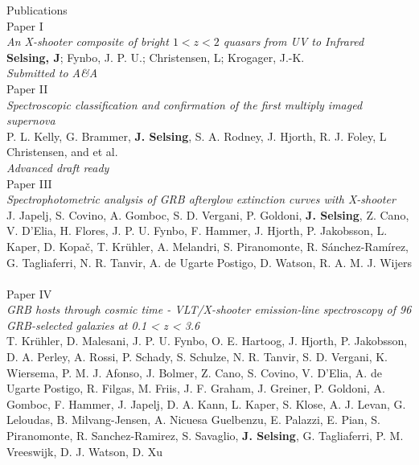 {\Large Publications} \\

{\large Paper I} \\
\textit{An X-shooter composite of bright $1<z<2$ quasars from UV to Infrared} \\
\textbf{Selsing, J}; Fynbo, J. P. U.; Christensen, L;  Krogager, J.-K. \\
\textit{Submitted to A\&A} \\

{\large Paper II} \\
\textit{Spectroscopic classification and confirmation of the first multiply imaged supernova}\\
P. L. Kelly, G. Brammer, \textbf{J. Selsing}, S. A. Rodney, J. Hjorth, R. J. Foley, L Christensen, and et al. \\
\textit{Advanced draft ready} \\


{\large Paper III} \\
\textit{Spectrophotometric analysis of GRB afterglow extinction curves with X-shooter} \\
J. Japelj, S. Covino, A. Gomboc, S. D. Vergani, P. Goldoni,\textbf{ J. Selsing}, Z. Cano, V. D'Elia, H. Flores, J. P. U. Fynbo, F. Hammer, J. Hjorth, P. Jakobsson, L. Kaper, D. Kopač, T. Krühler, A. Melandri, S. Piranomonte, R. Sánchez-Ramírez, G. Tagliaferri, N. R. Tanvir, A. de Ugarte Postigo, D. Watson, R. A. M. J. Wijers \\
\citet{Japelj2015} \\

{\large Paper IV} \\
\textit{GRB hosts through cosmic time - VLT/X-shooter emission-line spectroscopy of 96 GRB-selected galaxies at 0.1 < z < 3.6} \\
T. Krühler, D. Malesani, J. P. U. Fynbo, O. E. Hartoog, J. Hjorth, P. Jakobsson, D. A. Perley, A. Rossi, P. Schady, S. Schulze, N. R. Tanvir, S. D. Vergani, K. Wiersema, P. M. J. Afonso, J. Bolmer, Z. Cano, S. Covino, V. D'Elia, A. de Ugarte Postigo, R. Filgas, M. Friis, J. F. Graham, J. Greiner, P. Goldoni, A. Gomboc, F. Hammer, J. Japelj, D. A. Kann, L. Kaper, S. Klose, A. J. Levan, G. Leloudas, B. Milvang-Jensen, A. Nicuesa Guelbenzu, E. Palazzi, E. Pian, S. Piranomonte, R. Sanchez-Ramirez, S. Savaglio, \textbf{J. Selsing}, G. Tagliaferri, P. M. Vreeswijk, D. J. Watson, D. Xu \\
\citet{Kruhler2015} \\


